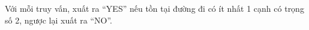 Với mỗi truy vấn, xuất ra “YES” nếu tồn tại đường đi có ít nhất 1 cạnh có trọng số 2, ngược lại xuất ra “NO”.

\